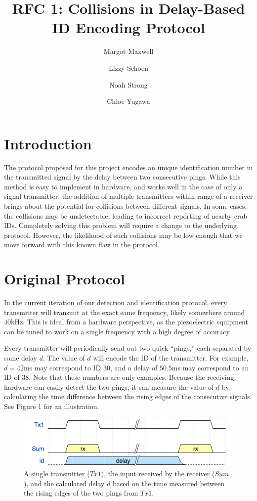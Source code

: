 \documentclass[12pt]{article}
\title{RFC 1: Collisions in Delay-Based ID Encoding Protocol}
\author{
	Margot Maxwell \and
	Lizzy Schoen \and
	Noah Strong \and
	Chloe Yugawa
}
\begin{document}
\maketitle

\tableofcontents{}


\section{Introduction}

The protocol proposed for this project encodes an unique identification number
in the transmitted signal by the delay between two consecutive pings.
While this method is easy to implement in hardware, and works well in the case
of only a signal transmitter, the addition of multiple transmitters within range
of a receiver brings about the potential for collisions between different
signals.
In some cases, the collisions may be undetectable, leading to incorrect
reporting of nearby crab IDs.
Completely solving this problem will require a change to the underlying
protocol.
However, the likelihood of such collisions may be low enough that we move
forward with this known flaw in the protocol.

\section{Original Protocol}

In the current iteration of our detection and identification protocol, every
transmitter will transmit at the exact same frequency, likely somewhere around
40kHz. This is ideal from a hardware perspective, as the piezoelectric
equipment can be tuned to work on a single frequency with a high degree of
accuracy.

Every transmitter will periodically send out two quick ``pings,'' each separated
by some delay $d$. The value of $d$ will encode the ID of the transmitter.
For example, $d=42$ms may correspond to ID 30, and a delay of $50.5$ms may
correspond to an ID of 38.
Note that these numbers are only examples.
Because the receiving hardware can easily detect the two pings, it can measure
the value of $d$ by calculating the time difference between the rising edges
of the consecutive signals. See Figure 1 for an illustration.

\begin{figure}[h]
\centering
\includegraphics[scale=0.7]{singleTx}

\caption{A single transmitter ($Tx1$), the input received by the receiver
($Sum$), and the calculated delay $d$ based on the time measured between
the rising edges of the two pings from $Tx1$.}
\end{figure}
\end{document}
